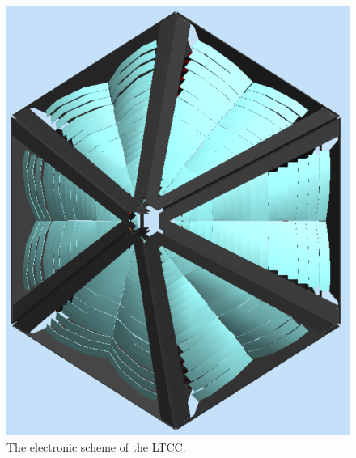 \begin{figure}
	\centering
	\includegraphics[width=0.95\columnwidth,keepaspectratio]{img/sim3.png}
	\caption{The electronic scheme of the LTCC.}
	\label{fig:sim3}
\end{figure}
